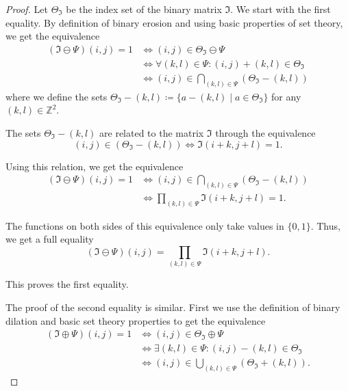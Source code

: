 \documentclass[a4paper,12pt]{article}
\theoremstyle{plain}
\theoremstyle{definition}
\begin{document}
\begin{proof}
	Let $\Theta_\mathfrak{I}$ be the index set of the binary matrix $\mathfrak{I}$. We start with the first equality. By definition of binary erosion and using basic properties of set theory, we get the equivalence
	\begin{align*}
		(\mathfrak{I} \ominus \Psi)(i, j) = 1 &\Leftrightarrow (i, j) \in \Theta_\mathfrak{I} \ominus \Psi \\
		&\Leftrightarrow \forall (k, l) \in \Psi: (i, j) + (k, l) \in \Theta_\mathfrak{I} \\
		&\Leftrightarrow (i, j) \in \bigcap_{(k, l) \in \Psi} ( \Theta_\mathfrak{I} - (k, l) )
	\end{align*}
	where we define the sets $\Theta_\mathfrak{I} - (k, l) \coloneqq \{ a - (k, l) \mid a \in \Theta_\mathfrak{I} \}$ for any $(k, l) \in \mathbb{Z}^2$.
	
	The sets $\Theta_\mathfrak{I} - (k, l)$ are related to the matrix $\mathfrak{I}$ through the equivalence
	\begin{equation*}
		(i, j) \in ( \Theta_\mathfrak{I} - (k, l) ) \Leftrightarrow \mathfrak{I}(i + k, j + l) = 1.
	\end{equation*}
	
	Using this relation, we get the equivalence
	\begin{align*}
		(\mathfrak{I} \ominus \Psi)(i, j) = 1 &\Leftrightarrow (i, j) \in \bigcap_{(k, l) \in \Psi} ( \Theta_\mathfrak{I} - (k, l) ) \\
		&\Leftrightarrow \prod_{(k, l) \in \Psi} \mathfrak{I}(i + k, j + l) = 1.
	\end{align*}
	
	The functions on both sides of this equivalence only take values in $\{ 0, 1 \}$. Thus, we get a full equality
	\begin{equation*}
		(\mathfrak{I} \ominus \Psi)(i, j) = \prod_{(k, l) \in \Psi} \mathfrak{I}(i + k, j + l).
	\end{equation*}
	
	This proves the first equality.
	
	The proof of the second equality is similar. First we use the definition of binary dilation and basic set theory properties to get the equivalence
	\begin{align*}
		(\mathfrak{I} \oplus \Psi)(i, j) = 1 &\Leftrightarrow (i, j) \in \Theta_\mathfrak{I} \oplus \Psi \\
		&\Leftrightarrow \exists (k, l) \in \Psi: (i, j) - (k, l) \in \Theta_\mathfrak{I} \\
		&\Leftrightarrow (i, j) \in \bigcup_{(k, l) \in \Psi} ( \Theta_\mathfrak{I} + (k, l) ).
	\end{align*}
	

\end{proof}
\end{document}
